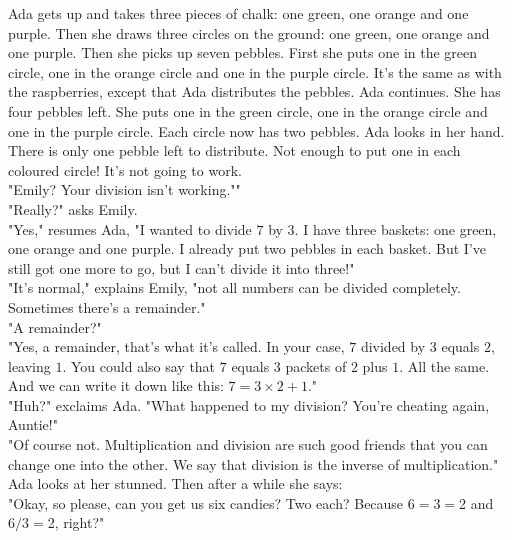 Ada gets up and takes three pieces of chalk: one green, one orange and one purple. Then she draws three circles on the ground: one green, one orange and one purple. Then she picks up seven pebbles. First she puts one in the green circle, one in the orange circle and one in the purple circle. It's the same as with the raspberries, except that Ada distributes the pebbles. Ada continues. She has four pebbles left. She puts one in the green circle, one in the orange circle and one in the purple circle. Each circle now has two pebbles. Ada looks in her hand. There is only one pebble left to distribute. Not enough to put one in each coloured circle! It's not going to work.\\
"Emily? Your division isn't working.""\\
"Really?" asks Emily. \\
"Yes," resumes Ada, "I wanted to divide $7$ by $3$. I have three baskets: one green, one orange and one purple. I already put two pebbles in each basket. But I've still got one more to go, but I can't divide it into three!"\\
"It's normal," explains Emily, "not all numbers can be divided completely. Sometimes there's a remainder." \\
"A remainder?" \\
"Yes, a remainder, that's what it's called. In your case, $7$ divided by $3$ equals $2$, leaving $1$. You could also say that $7$ equals $3$ packets of $2$ plus $1$. All the same. And we can write it down like this: $7=3\times2+1$." \\
"Huh?" exclaims Ada. "What happened to my division? You're cheating again, Auntie!" \\
"Of course not. Multiplication and division are such good friends that you can change one into the other. We say that division is the inverse of multiplication."\\
Ada looks at her stunned. Then after a while she says: \\
"Okay, so please, can you get us six candies? Two each? Because $6 = 3 = $2 and $6 / 3 = $2, right?" 

